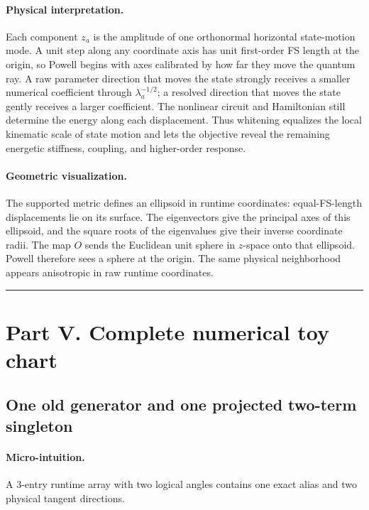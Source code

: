\documentclass[10pt,twocolumn]{article}
\newcommand{\conceptbreak}{%
  \par\medskip\noindent
  {\color{black!30}\rule{\columnwidth}{0.35pt}}%
  \par\medskip}
\newcommand{\micro}{\paragraph{Micro-intuition.}}
\newcommand{\physical}{\paragraph{Physical interpretation.}}
\newcommand{\geometryblock}{\paragraph{Geometric visualization.}}
\begin{document}
\physical Each component \(z_a\) is the amplitude of one orthonormal
horizontal state-motion mode. A unit step along any coordinate axis has unit
first-order FS length at the origin, so Powell begins with axes calibrated by
how far they move the quantum ray. A raw parameter direction that moves the
state strongly receives a smaller numerical coefficient through
\(\lambda_a^{-1/2}\); a resolved direction that moves the state gently receives
a larger coefficient. The nonlinear circuit and Hamiltonian still determine
the energy along each displacement. Thus whitening equalizes the local
kinematic scale of state motion and lets the objective reveal the remaining
energetic stiffness, coupling, and higher-order response.

\geometryblock The supported metric defines an ellipsoid in runtime
coordinates: equal-FS-length displacements lie on its surface. The eigenvectors
give the principal axes of this ellipsoid, and the square roots of the
eigenvalues give their inverse coordinate radii. The map \(O\) sends the
Euclidean unit sphere in \(z\)-space onto that ellipsoid. Powell therefore sees
a sphere at the origin. The same physical neighborhood appears anisotropic in
raw runtime coordinates.

\conceptbreak

\section*{Part V. Complete numerical toy chart}

\subsection*{One old generator and one projected two-term singleton}

\micro A \(3\)-entry runtime array with two logical angles contains one exact
alias and two physical tangent directions.
\end{document}
